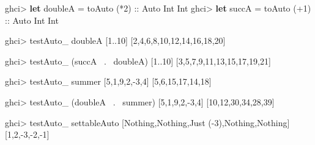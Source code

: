 \documentclass[]{article}
\newenvironment{Shaded}{}{}
\newcommand{\DataTypeTok}[1]{\textcolor[rgb]{0.56,0.13,0.00}{#1}}
\newcommand{\DecValTok}[1]{\textcolor[rgb]{0.25,0.63,0.44}{#1}}
\newcommand{\FunctionTok}[1]{\textcolor[rgb]{0.02,0.16,0.49}{#1}}
\newcommand{\KeywordTok}[1]{\textcolor[rgb]{0.00,0.44,0.13}{\textbf{#1}}}
\newcommand{\NormalTok}[1]{#1}
\newcommand{\OtherTok}[1]{\textcolor[rgb]{0.00,0.44,0.13}{#1}}
\begin{document}
\begin{Shaded}
\begin{Highlighting}[]
\NormalTok{ghci}\FunctionTok{>} \KeywordTok{let}\NormalTok{ doubleA  }\FunctionTok{=}\NormalTok{ toAuto (}\FunctionTok{*}\DecValTok{2}\NormalTok{)}\OtherTok{      ::} \DataTypeTok{Auto} \DataTypeTok{Int} \DataTypeTok{Int}
\NormalTok{ghci}\FunctionTok{>} \KeywordTok{let}\NormalTok{ succA    }\FunctionTok{=}\NormalTok{ toAuto (}\FunctionTok{+}\DecValTok{1}\NormalTok{)}\OtherTok{      ::} \DataTypeTok{Auto} \DataTypeTok{Int} \DataTypeTok{Int}

\NormalTok{ghci}\FunctionTok{>}\NormalTok{ testAuto_ doubleA [}\DecValTok{1}\FunctionTok{..}\DecValTok{10}\NormalTok{]}
\NormalTok{[}\DecValTok{2}\NormalTok{,}\DecValTok{4}\NormalTok{,}\DecValTok{6}\NormalTok{,}\DecValTok{8}\NormalTok{,}\DecValTok{10}\NormalTok{,}\DecValTok{12}\NormalTok{,}\DecValTok{14}\NormalTok{,}\DecValTok{16}\NormalTok{,}\DecValTok{18}\NormalTok{,}\DecValTok{20}\NormalTok{]}

\NormalTok{ghci}\FunctionTok{>}\NormalTok{ testAuto_ (succA }\FunctionTok{~.~}\NormalTok{ doubleA) [}\DecValTok{1}\FunctionTok{..}\DecValTok{10}\NormalTok{]}
\NormalTok{[}\DecValTok{3}\NormalTok{,}\DecValTok{5}\NormalTok{,}\DecValTok{7}\NormalTok{,}\DecValTok{9}\NormalTok{,}\DecValTok{11}\NormalTok{,}\DecValTok{13}\NormalTok{,}\DecValTok{15}\NormalTok{,}\DecValTok{17}\NormalTok{,}\DecValTok{19}\NormalTok{,}\DecValTok{21}\NormalTok{]}

\NormalTok{ghci}\FunctionTok{>}\NormalTok{ testAuto_ summer [}\DecValTok{5}\NormalTok{,}\DecValTok{1}\NormalTok{,}\DecValTok{9}\NormalTok{,}\DecValTok{2}\NormalTok{,}\FunctionTok{-}\DecValTok{3}\NormalTok{,}\DecValTok{4}\NormalTok{]}
\NormalTok{[}\DecValTok{5}\NormalTok{,}\DecValTok{6}\NormalTok{,}\DecValTok{15}\NormalTok{,}\DecValTok{17}\NormalTok{,}\DecValTok{14}\NormalTok{,}\DecValTok{18}\NormalTok{]}

\NormalTok{ghci}\FunctionTok{>}\NormalTok{ testAuto_ (doubleA }\FunctionTok{~.~}\NormalTok{ summer) [}\DecValTok{5}\NormalTok{,}\DecValTok{1}\NormalTok{,}\DecValTok{9}\NormalTok{,}\DecValTok{2}\NormalTok{,}\FunctionTok{-}\DecValTok{3}\NormalTok{,}\DecValTok{4}\NormalTok{]}
\NormalTok{[}\DecValTok{10}\NormalTok{,}\DecValTok{12}\NormalTok{,}\DecValTok{30}\NormalTok{,}\DecValTok{34}\NormalTok{,}\DecValTok{28}\NormalTok{,}\DecValTok{39}\NormalTok{]}

\NormalTok{ghci}\FunctionTok{>}\NormalTok{ testAuto_ settableAuto [}\DataTypeTok{Nothing}\NormalTok{,}\DataTypeTok{Nothing}\NormalTok{,}\DataTypeTok{Just}\NormalTok{ (}\FunctionTok{-}\DecValTok{3}\NormalTok{),}\DataTypeTok{Nothing}\NormalTok{,}\DataTypeTok{Nothing}\NormalTok{]}
\NormalTok{[}\DecValTok{1}\NormalTok{,}\DecValTok{2}\NormalTok{,}\FunctionTok{-}\DecValTok{3}\NormalTok{,}\FunctionTok{-}\DecValTok{2}\NormalTok{,}\FunctionTok{-}\DecValTok{1}\NormalTok{]}


\end{Highlighting}
\end{Shaded}
\end{document}
